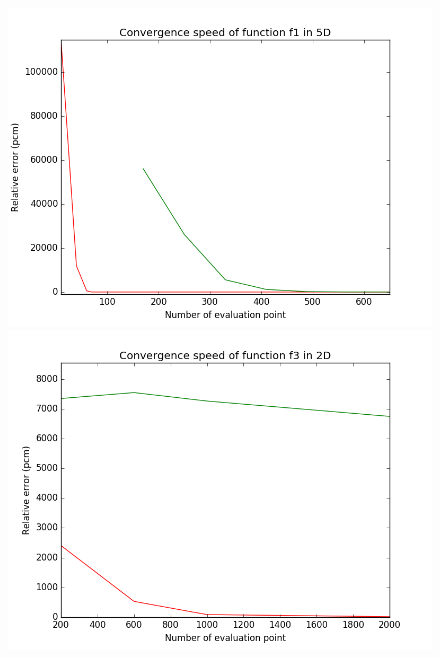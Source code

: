 \begin{figure}[h]
   \begin{minipage}[b]{0.32\linewidth}
      \centering \includegraphics[scale=0.3]{images/f1_5d.png}
   \end{minipage}
   \begin{minipage}[b]{0.32\linewidth}
      \centering \includegraphics[scale=0.3]{images/f3_2d.png}
   \end{minipage}
   \begin{minipage}[b]{0.32\linewidth}

\end{minipage}
\end{figure}
